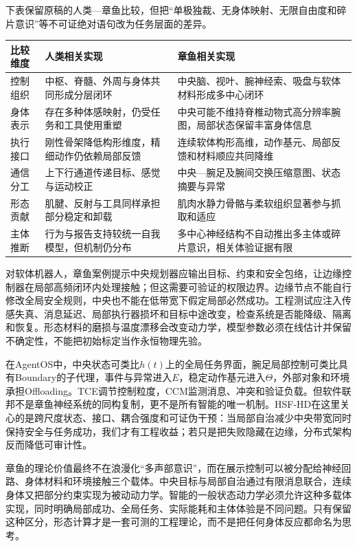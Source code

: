 下表保留原稿的人类—章鱼比较，但把“单极独裁、无身体映射、无限自由度和碎片意识”等不可证绝对语句改为任务层面的差异。

\begin{table}[htbp]
\centering
\begin{tabularx}{\textwidth}{l X X}
\toprule
比较维度 & 人类相关实现 & 章鱼相关实现 \\
\midrule
控制组织 & 中枢、脊髓、外周与身体共同形成分层闭环 & 中央脑、视叶、腕神经索、吸盘与软体材料形成多中心闭环 \\
身体表示 & 存在多种体感映射，仍受任务和工具使用重塑 & 中央可能不维持脊椎动物式高分辨率腕图，局部状态保留丰富身体信息 \\
执行接口 & 刚性骨架降低构形维度，精细动作仍依赖局部反馈 & 连续软体构形高维，动作基元、局部反馈和材料顺应共同降维 \\
通信分工 & 上下行通道传递目标、感觉与运动校正 & 中央—腕足及腕间交换压缩意图、状态摘要与异常 \\
形态贡献 & 肌腱、反射与工具同样承担部分稳定和卸载 & 肌肉水静力骨骼与柔软组织显著参与抓取和适应 \\
主体推断 & 行为与报告支持较统一自我模型，但机制仍分布 & 多中心神经结构不自动推出多主体或碎片意识，相关体验证据有限 \\
\bottomrule
\end{tabularx}
\end{table}

对软体机器人，章鱼案例提示中央规划器应输出目标、约束和安全包络，让边缘控制器在局部高频闭环内处理接触；但这需要可验证的权限边界。边缘节点不能自行修改全局安全规则，中央也不能在低带宽下假定局部必然成功。工程测试应注入传感失真、消息延迟、局部执行器损坏和目标中途改变，检查系统是否能降级、隔离和恢复。形态材料的磨损与温度漂移会改变动力学，模型参数必须在线估计并保留不确定性，不能把初始标定当作永恒物理先验。

在AgentOS中，中央状态可类比$h(t)$上的全局任务界面，腕足局部控制可类比具有Boundary的子代理，事件与异常进入$E$，稳定动作基元进入$\Theta$，外部对象和环境承担Offloading。TCE调节控制粒度，CCM监测消息、冲突和验证负载。但软件联邦不是章鱼神经系统的同构复制，更不是所有智能的唯一机制。HSF-HD在这里关心的是跨尺度状态、接口、耦合强度和可证伪干预：当局部自治减少中央带宽同时保持安全与任务成功，我们才有工程收益；若只是把失败隐藏在边缘，分布式架构反而降低可审计性。

章鱼的理论价值最终不在浪漫化“多声部意识”，而在展示控制可以被分配给神经回路、身体材料和环境接触三个载体。中央目标与局部自治通过有限消息联合，连续身体又把部分约束实现为被动动力学。智能的一般状态动力学必须允许这种多载体实现，同时明确局部成功、全局任务、实际能耗和主体体验是不同问题。只有保留这种区分，形态计算才是一套可测的工程理论，而不是把任何身体反应都命名为思考。

